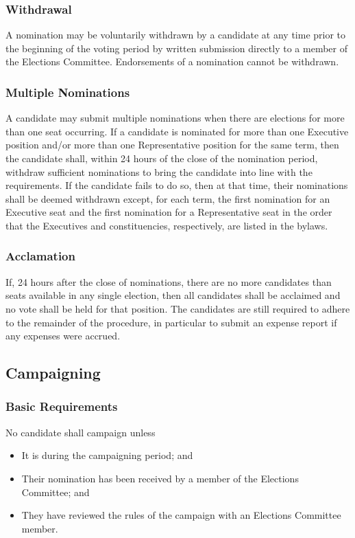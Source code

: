 \subsubsection{Withdrawal}
A nomination may be voluntarily withdrawn by a candidate at any time prior to the beginning of the voting period by written submission directly to a member of the Elections Committee.
Endorsements of a nomination cannot be withdrawn.

\subsubsection{Multiple Nominations}
A candidate may submit multiple nominations when there are elections for more than one seat occurring.
If a candidate is nominated for more than one Executive position and/or more than one Representative position for the same term, then the candidate shall, within 24 hours of the close of the nomination period, withdraw sufficient nominations to bring the candidate into line with the requirements.
If the candidate fails to do so, then at that time, their nominations shall be deemed withdrawn except, for each term, the first nomination for an Executive seat and the first nomination for a Representative seat in the order that the Executives and constituencies, respectively, are listed in the bylaws.

\subsubsection{Acclamation}
If, 24 hours after the close of nominations, there are no more candidates than seats available in any single election, then all candidates shall be acclaimed and no vote shall be held for that position.
The candidates are still required to adhere to the remainder of the procedure, in particular to submit an expense report if any expenses were accrued.

\subsection{Campaigning}
\subsubsection{Basic Requirements}
No candidate shall campaign unless
\begin{itemize}
	\item It is during the campaigning period; and
	\item Their nomination has been received by a member of the Elections Committee; and
	\item They have reviewed the rules of the campaign with an Elections Committee member.
\end{itemize}

